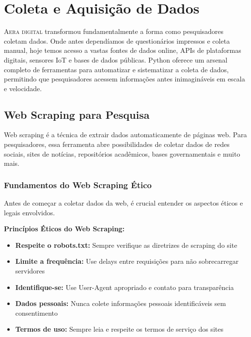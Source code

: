 
\chapter{Coleta e Aquisição de Dados}

\lettrine{A}{era digital} transformou fundamentalmente a forma como pesquisadores coletam dados. Onde antes dependíamos de questionários impressos e coleta manual, hoje temos acesso a vastas fontes de dados online, APIs de plataformas digitais, sensores IoT e bases de dados públicas. Python oferece um arsenal completo de ferramentas para automatizar e sistematizar a coleta de dados, permitindo que pesquisadores acessem informações antes inimagináveis em escala e velocidade.

\section{Web Scraping para Pesquisa}

Web scraping é a técnica de extrair dados automaticamente de páginas web. Para pesquisadores, essa ferramenta abre possibilidades de coletar dados de redes sociais, sites de notícias, repositórios acadêmicos, bases governamentais e muito mais.

\subsection{Fundamentos do Web Scraping Ético}

Antes de começar a coletar dados da web, é crucial entender os aspectos éticos e legais envolvidos.

\begin{warningbox}
\textbf{Princípios Éticos do Web Scraping:}
\begin{itemize}
    \item \textbf{Respeite o robots.txt:} Sempre verifique as diretrizes de scraping do site
    \item \textbf{Limite a frequência:} Use delays entre requisições para não sobrecarregar servidores
    \item \textbf{Identifique-se:} Use User-Agent apropriado e contato para transparência
    \item \textbf{Dados pessoais:} Nunca colete informações pessoais identificáveis sem consentimento
    \item \textbf{Termos de uso:} Sempre leia e respeite os termos de serviço dos sites
\end{itemize}
\end{warningbox}

